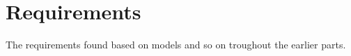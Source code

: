 \chapter{Requirements}
The requirements found based on models and so on troughout the earlier parts.
